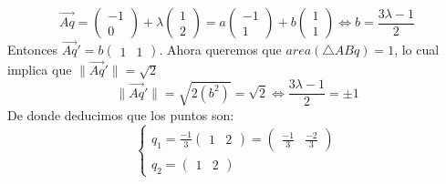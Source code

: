 \documentclass{article}
\newcommand{\vv}[1]{\overrightarrow{#1}}
\newcommand{\norm}[1]{\lVert #1 \rVert }
\begin{document}
\begin{enumerate}
\[
\vv{Aq} = \begin{pmatrix} -1 \\ 0 \end{pmatrix} + \lambda \begin{pmatrix} 1 \\ 2 \end{pmatrix}
=
a \begin{pmatrix} -1 \\ 1 \end{pmatrix} + b  \begin{pmatrix} 1 \\ 1 \end{pmatrix}
\iff
b = \frac{3 \lambda - 1}{2}
\]
Entonces $\vv{Aq}' = b \begin{pmatrix}1 & 1 \end{pmatrix}$. Ahora queremos que
$area(\triangle ABq) = 1$, lo cual implica que $\norm{\vv{Aq}'} = \sqrt{2}$
\[
\norm{\vv{Aq}'} = \sqrt{2 \left( b^2 \right)} = \sqrt{2}
\iff
\frac{3 \lambda - 1}{2} = \pm 1
\]
De donde deducimos que los puntos son:
\[
\begin{cases}
q_1 = \frac{-1}{3} \begin{pmatrix} 1 & 2\end{pmatrix} =
\begin{pmatrix} \frac{-1}{3} & \frac{-2}{3}\end{pmatrix} \\
q_2 =  \begin{pmatrix} 1 & 2 \end{pmatrix}
\end{cases}
\]
\\ \\ \\ \\
\end{enumerate}
\end{document}
